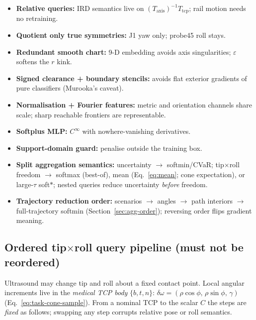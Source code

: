 \documentclass[11pt,a4paper]{article}
\newcommand{\Tcp}{T_{\mathrm{tcp}}}
\newcommand{\Taxis}{T_{\mathrm{axis}}}
\begin{document}
\begin{itemize}[leftmargin=1.4em]
  \item \textbf{Relative queries:} IRD semantics live on \((\Taxis)^{-1}\Tcp\);
        rail motion needs no retraining.
  \item \textbf{Quotient only true symmetries:} J1 yaw only; probe45 roll stays.
  \item \textbf{Redundant smooth chart:} 9-D embedding avoids axis singularities;
        \(\varepsilon\) softens the \(r\) kink.
  \item \textbf{Signed clearance + boundary stencils:} avoids flat exterior
        gradients of pure classifiers (Murooka's caveat).
  \item \textbf{Normalisation + Fourier features:} metric and orientation
        channels share scale; sharp reachable frontiers are representable.
  \item \textbf{Softplus MLP:} \(C^{\infty}\) with nowhere-vanishing derivatives.
  \item \textbf{Support-domain guard:} penalise outside the training box.
  \item \textbf{Split aggregation semantics:} uncertainty \(\to\) softmin/CVaR;
        tip$\times$roll freedom \(\to\) softmax (best-of), mean
        (Eq.~\eqref{eq:mean}; cone expectation), or large-\(\tau\) soft\(*\);
        nested queries reduce uncertainty \emph{before} freedom.
  \item \textbf{Trajectory reduction order:} scenarios \(\to\) angles \(\to\) path
        interiors \(\to\) full-trajectory softmin (Section~\ref{sec:agg-order});
        reversing order flips gradient meaning.
\end{itemize}

\subsection{Ordered tip$\times$roll query pipeline (must not be reordered)}
\label{sec:tip-roll-pipeline}

Ultrasound may change tip and roll about a fixed contact point. Local angular
increments live in the \emph{medical TCP body} \(\{b,t,n\}\):
\(\delta\omega=(\rho\cos\phi,\,\rho\sin\phi,\,\gamma)\)
(Eq.~\eqref{eq:task-cone-sample}). From a nominal TCP to the scalar \(C\) the
steps are \emph{fixed} as follows; swapping any step corrupts relative pose or
roll semantics.
\end{document}
